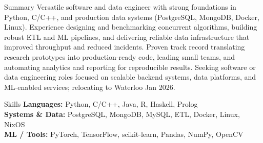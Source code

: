 \documentclass{resume}
\begin{document}
\begin{rSection}{Summary}
Versatile software and data engineer with strong foundations in Python, C/C++, and production data systems (PostgreSQL, MongoDB, Docker, Linux). Experience designing and benchmarking concurrent algorithms, building robust ETL and ML pipelines, and delivering reliable data infrastructure that improved throughput and reduced incidents. Proven track record translating research prototypes into production-ready code, leading small teams, and automating analytics and reporting for reproducible results. Seeking software or data engineering roles focused on scalable backend systems, data platforms, and ML-enabled services; relocating to Waterloo Jan 2026.
\end{rSection}

\begin{rSection}{Skills}
\textbf{Languages:} Python, C/C++, Java, R, Haskell, Prolog \\
\textbf{Systems \& Data:} PostgreSQL, MongoDB, MySQL, ETL, Docker, Linux, NixOS \\
\textbf{ML / Tools:} PyTorch, TensorFlow, scikit-learn, Pandas, NumPy, OpenCV
\end{rSection}
\end{document}
